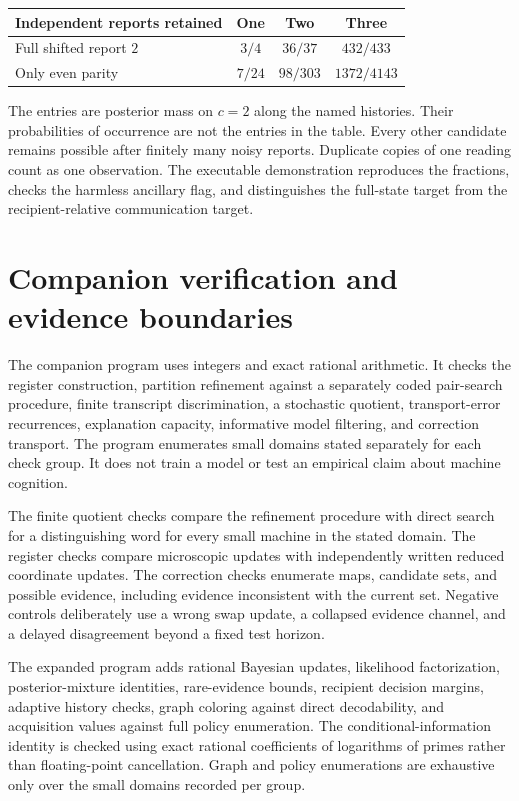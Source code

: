 \documentclass[11pt,oneside,openany]{book}
\numberwithin{equation}{section}
\begin{document}
\begin{center}
\begin{tabular}{@{}lccc@{}}\toprule
Independent reports retained & One & Two & Three\\\midrule
Full shifted report $2$ & $3/4$ & $36/37$ & $432/433$\\
Only even parity & $7/24$ & $98/303$ & $1372/4143$\\\bottomrule
\end{tabular}
\end{center}
The entries are posterior mass on $c=2$ along the named histories. Their probabilities of occurrence are not the entries in the table. Every other candidate remains possible after finitely many noisy reports. Duplicate copies of one reading count as one observation. The executable demonstration reproduces the fractions, checks the harmless ancillary flag, and distinguishes the full-state target from the recipient-relative communication target.

\section{Companion verification and evidence boundaries}\label{MU:app:verification}
The companion program  uses integers and exact rational arithmetic. It checks the register construction, partition refinement against a separately coded pair-search procedure, finite transcript discrimination, a stochastic quotient, transport-error recurrences, explanation capacity, informative model filtering, and correction transport. The program enumerates small domains stated separately for each check group. It does not train a model or test an empirical claim about machine cognition.

The finite quotient checks compare the refinement procedure with direct search for a distinguishing word for every small machine in the stated domain. The register checks compare microscopic updates with independently written reduced coordinate updates. The correction checks enumerate maps, candidate sets, and possible evidence, including evidence inconsistent with the current set. Negative controls deliberately use a wrong swap update, a collapsed evidence channel, and a delayed disagreement beyond a fixed test horizon.

The expanded program  adds rational Bayesian updates, likelihood factorization, posterior-mixture identities, rare-evidence bounds, recipient decision margins, adaptive history checks, graph coloring against direct decodability, and acquisition values against full policy enumeration. The conditional-information identity is checked using exact rational coefficients of logarithms of primes rather than floating-point cancellation. Graph and policy enumerations are exhaustive only over the small domains recorded per group.
\end{document}
